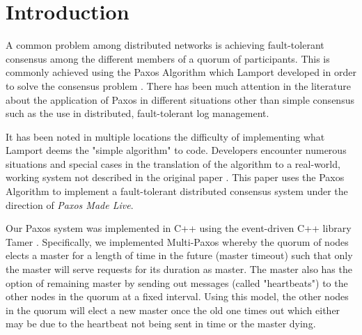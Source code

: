
\section{Introduction}
A common problem among distributed networks is achieving fault-tolerant consensus among the different members of a quorum of participants.  This is commonly achieved using the Paxos Algorithm which Lamport developed in order to solve the consensus problem \cite{Lamport01}.  There has been much attention in the literature about the application of Paxos in different situations other than simple consensus such as the use in distributed, fault-tolerant log management.  

It has been noted in multiple locations the difficulty of implementing what Lamport deems the "simple algorithm" to code.  Developers encounter numerous situations and special cases in the translation of the algorithm to a real-world, working system not described in the original paper \cite{Chandra07}.  This paper uses the Paxos Algorithm to implement a fault-tolerant distributed consensus system under the direction of \textit{Paxos Made Live}. 

Our Paxos system was implemented in C++ using the event-driven C++ library Tamer \cite{Krohn07}.  Specifically, we implemented Multi-Paxos whereby the quorum of nodes elects a master for a length of time in the future (master timeout) such that only the master will serve requests for its duration as master.  The master also has the option of remaining master by sending out messages (called "heartbeats") to the other nodes in the quorum at a fixed interval.  Using this model, the other nodes in the quorum will elect a new master once the old one times out which either may be due to the heartbeat not being sent in time or the master dying.